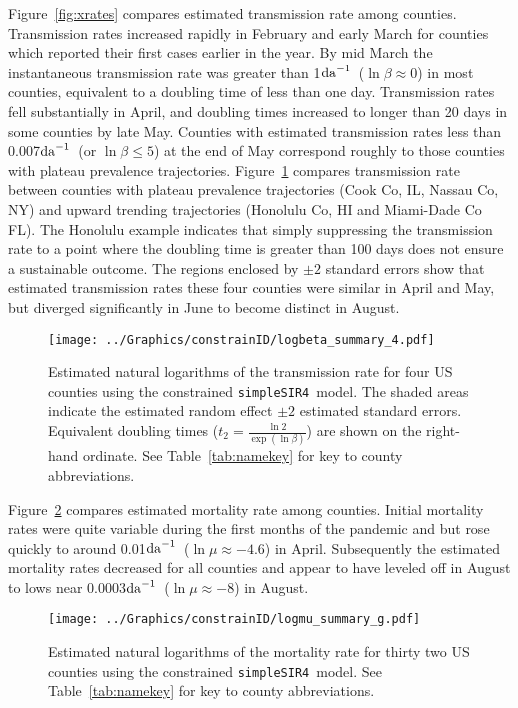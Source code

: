\documentclass[12pt,letterpaper]{article}
\newcommand\perda{$\rm{da}^{-1}$}
\newcommand\SSm{{\tt simpleSIR4}}
\begin{document}
Figure~\ref{fig:xrates} compares estimated transmission rate among
counties.
Transmission rates increased rapidly in February and early March for
counties which reported their first cases earlier in the year.
By mid March the instantaneous transmission rate
was greater than 1\perda\ ($\ln \beta \approx 0$) in most counties,
equivalent to a doubling time of less than one day.
Transmission rates fell substantially in April, and doubling times
increased to longer than 20 days in some counties by late May.
Counties with estimated transmission rates less than 0.007\perda\ 
(or $\ln \beta \le 5$) at the end of May
correspond roughly to those counties with plateau prevalence
trajectories.
Figure~\ref{fig:xrates2} compares transmission rate between counties
with plateau prevalence trajectories (Cook Co, IL, Nassau Co, NY) and
upward  trending trajectories (Honolulu Co, HI and Miami-Dade Co
FL). The Honolulu example indicates that simply suppressing the
transmission rate to a point where the doubling time is greater than
100 days does not ensure a sustainable outcome. The regions enclosed
by $\pm 2$ standard errors show that estimated transmission rates
these four counties were similar in April and May, but diverged
significantly in June to become distinct in August.

\begin{figure}[h!]
\begin{center}
\texttt{[image: ../Graphics/constrainID/logbeta\_summary\_4.pdf]}\\
\end{center}
\caption{\label{fig:xrates2}
Estimated natural logarithms of the transmission rate for four US
counties using the constrained \SSm\ model.
The shaded areas indicate the estimated random effect $\pm 2$
estimated standard errors.
Equivalent doubling times ($t_2 = \frac{\ln 2}{\exp(\ln \beta)}$)
are shown on the right-hand ordinate.
See Table~\ref{tab:namekey} for key to county abbreviations.
}
\end{figure}

Figure~\ref{fig:drates} compares estimated mortality rate among
counties. Initial mortality rates were quite variable during the first
months of the pandemic and but rose quickly to around 
0.01\perda\ ($\ln \mu \approx -4.6$) in April. Subsequently the
estimated mortality rates decreased for all counties and appear to
have leveled off in August to lows near
0.0003\perda\ ($\ln \mu \approx -8$) in August.

\begin{figure}
\begin{center}
\texttt{[image: ../Graphics/constrainID/logmu\_summary\_g.pdf]}\\
\end{center}
\caption{\label{fig:drates}
Estimated natural logarithms of the mortality rate for thirty two US
counties using the constrained \SSm\ model.
See Table~\ref{tab:namekey} for key to county abbreviations.
}
\end{figure}
\end{document}

